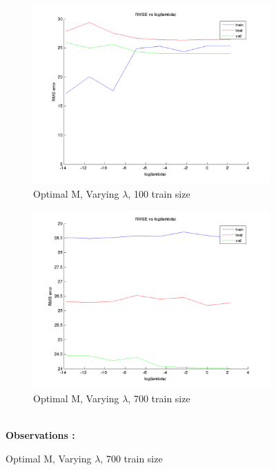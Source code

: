 \documentclass{article}
\begin{document}
\begin{figure}[H]
\begin{subfigure}{.5\textwidth}
\centering
\includegraphics[width=\linewidth]{D2/RMS_lambda_100}
\caption{Optimal M, Varying $\lambda$, 100 train size}
\end{subfigure}
\begin{subfigure}{.5\textwidth}
\includegraphics[width=\linewidth]{D2/RMS_lambda_700}
\caption{Optimal M, Varying $\lambda$, 700 train size}
\end{subfigure}


\textbf{\\[20pt]Observations :}


\end{figure}
\end{document}
